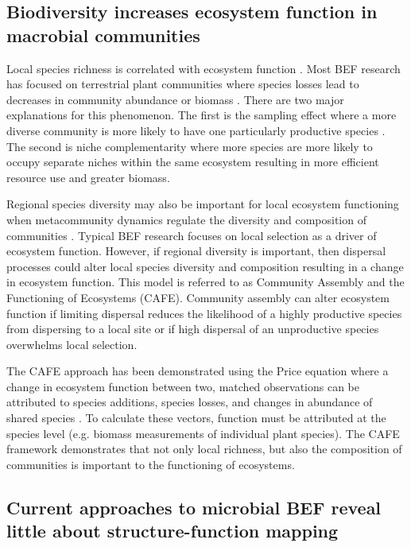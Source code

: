 \documentclass{article}
\begin{document}
\subsection{Biodiversity increases ecosystem function in macrobial communities}


Local species richness is correlated with ecosystem function
\citep{hooper2005}. Most BEF research has focused on terrestrial plant 
communities where species losses lead to decreases in community abundance or biomass
\citep{naeem2003}. There are
two major explanations for this phenomenon. The first is the sampling effect
where a more diverse community is more likely to have one particularly
productive species \citep{cardinale2006}. The second is niche complementarity where more species are
more likely to occupy separate niches within the same ecosystem resulting in
more efficient resource use and greater biomass.

Regional species diversity may also be important for
local ecosystem functioning when metacommunity dynamics regulate the
diversity and composition of communities \citep{leibold2017}. 
Typical BEF research focuses on local selection
as a driver of ecosystem function. However, if regional
diversity is important, then dispersal processes could alter local species diversity and composition resulting in
a change in ecosystem function. This model is referred to as Community Assembly
and the Functioning of Ecosystems (CAFE). Community assembly can alter ecosystem
function if limiting dispersal reduces the likelihood of a highly productive
species from dispersing to a local site or if high dispersal of an unproductive
species overwhelms local selection.

The CAFE approach has been demonstrated using the Price equation where a change in ecosystem function between two, matched
observations can be attributed to species additions, species losses, and
changes in abundance of shared species \citep{fox2006,
bannar-martin2018}. To
calculate these vectors, function must be attributed at the species level (e.g.
biomass measurements of individual plant species). The CAFE framework demonstrates
that not only local richness, 
but also the composition of communities is important to the functioning of ecosystems.

\subsection{Current approaches to microbial BEF reveal little about 
structure-function mapping}
\end{document}
